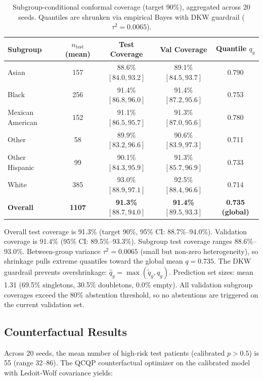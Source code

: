 \documentclass[11pt,a4paper]{article}
\theoremstyle{plain}
\begin{document}
\begin{table}[htbp]
\centering
\caption{Subgroup-conditional conformal coverage (target 90\%), aggregated across 20 seeds. Quantiles are shrunken via empirical Bayes with DKW guardrail ($\tau^2=0.0065$).}
\label{tab:coverage}
\begin{tabular}{lcccc}
\toprule
Subgroup & $n_{\text{test}}$ (mean) & Test Coverage & Val Coverage & Quantile $q_g$ \\
\midrule
Asian & 157 & 88.6\% $[84.0, 93.2]$ & 89.1\% $[84.5, 93.7]$ & 0.790 \\
Black & 256 & 91.4\% $[86.8, 96.0]$ & 91.4\% $[87.2, 95.6]$ & 0.753 \\
Mexican American & 152 & 91.1\% $[86.5, 95.7]$ & 91.3\% $[87.0, 95.6]$ & 0.780 \\
Other & 58 & 89.9\% $[83.2, 96.6]$ & 90.6\% $[83.9, 97.3]$ & 0.711 \\
Other Hispanic & 99 & 90.1\% $[84.3, 95.9]$ & 91.3\% $[85.7, 96.9]$ & 0.733 \\
White & 385 & 93.0\% $[88.9, 97.1]$ & 92.5\% $[88.4, 96.6]$ & 0.714 \\
\midrule
\textbf{Overall} & \textbf{1107} & \textbf{91.3\%} $[88.7, 94.0]$ & \textbf{91.4\%} $[89.5, 93.3]$ & \textbf{0.735 (global)} \\
\bottomrule
\end{tabular}
\end{table}

Overall test coverage is 91.3\% (target 90\%, 95\% CI: 88.7\%--94.0\%). Validation coverage is 91.4\% (95\% CI: 89.5\%--93.3\%). Subgroup test coverage ranges 88.6\%--93.0\%. Between-group variance $\tau^2=0.0065$ (small but non-zero heterogeneity), so shrinkage pulls extreme quantiles toward the global mean $q=0.735$. The DKW guardrail prevents overshrinkage: $\hat{q}_g = \max(\tilde{q}_g, q_g)$. Prediction set sizes: mean 1.31 (69.5\% singletons, 30.5\% doubletons, 0.0\% empty). All validation subgroup coverages exceed the 80\% abstention threshold, so no abstentions are triggered on the current validation set.

\subsection{Counterfactual Results}

Across 20 seeds, the mean number of high-risk test patients (calibrated $p > 0.5$) is 55 (range 32--86). The QCQP counterfactual optimizer on the calibrated model with Ledoit-Wolf covariance yields:
\end{document}
